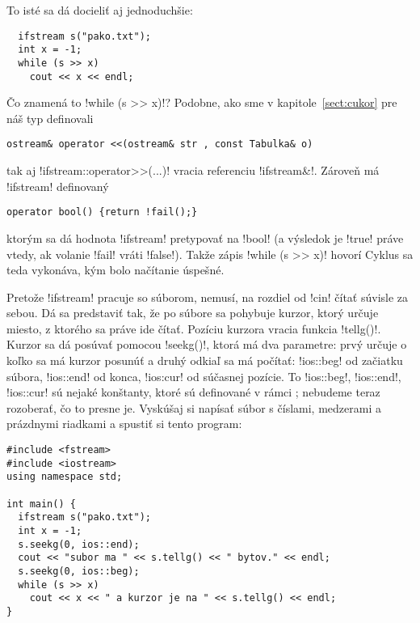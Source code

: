 To isté sa dá docieliť aj jednoduchšie:

\begin{lstlisting}
  ifstream s("pako.txt");
  int x = -1;
  while (s >> x)
    cout << x << endl;
\end{lstlisting}

Čo znamená to \prg!while (s >> x)!? Podobne, ako sme v kapitole~\ref{sect:cukor}
pre náš typ  definovali 

\begin{lstlisting}
ostream& operator <<(ostream& str , const Tabulka& o)
\end{lstlisting}

tak aj \prg!ifstream::operator>>(...)! vracia referenciu \prg!ifstream&!. Zároveň
má \prg!ifstream! definovaný 
\begin{lstlisting}
operator bool() {return !fail();}
\end{lstlisting}
ktorým sa dá hodnota
\prg!ifstream! pretypovať na \prg!bool! (a výsledok je \prg!true! práve vtedy,
ak volanie \prg!fail! vráti \prg!false!). Takže zápis \prg!while (s >> x)! hovorí
 Cyklus sa teda vykonáva, kým bolo načítanie úspešné.


Pretože \prg!ifstream! pracuje so súborom, nemusí, na rozdiel od \prg!cin! čítať súvisle
za sebou. Dá sa predstaviť tak, že po súbore sa pohybuje kurzor, ktorý určuje miesto, z ktorého
sa práve ide čítať. Pozíciu kurzora vracia funkcia \prg!tellg()!. Kurzor sa dá posúvať
pomocou \prg!seekg()!, ktorá má dva parametre: prvý určuje o koľko sa má kurzor posunúť
a druhý odkiaľ sa má počítať: \prg!ios::beg! od začiatku súbora, \prg!ios::end! od konca, 
\prg!ios:cur! od súčasnej pozície. 
To \prg!ios::beg!, \prg!ios::end!, \prg!ios::cur! sú nejaké
konštanty, ktoré sú definované
v rámci ; nebudeme teraz rozoberať, čo to presne je.
Vyskúšaj si napísať súbor  s číslami,
medzerami a prázdnymi riadkami a spustiť si tento program:

\begin{lstlisting}
#include <fstream>
#include <iostream>
using namespace std;

int main() {
  ifstream s("pako.txt");
  int x = -1;
  s.seekg(0, ios::end);
  cout << "subor ma " << s.tellg() << " bytov." << endl;
  s.seekg(0, ios::beg);
  while (s >> x)
    cout << x << " a kurzor je na " << s.tellg() << endl;
}
\end{lstlisting}


